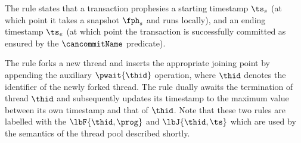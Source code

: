 The  rule states that a transaction prophesies a starting timestamp $\ts_s$ (at which point it takes a snapshot $\fph_s$ and runs locally), and an ending timestamp $\ts_e$ (at which point the transaction is successfully committed as ensured by the $\cancommitName$ predicate).

The  rule forks a new thread and inserts the appropriate joining point by appending the auxiliary \( \pwait{\thid} \) operation, where $\thid$ denotes the identifier of the newly forked thread. 
The  rule dually awaits the termination of thread $\thid$ and subsequently updates its timestamp to the maximum value between its own timestamp and that of $\thid$.
Note that these two rules are labelled with the $\lbF{\thid, \prog}$ and $\lbJ{\thid, \ts}$ which are used by the semantics of the thread pool described shortly.

